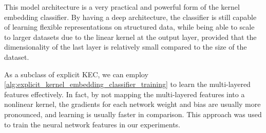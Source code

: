 \documentclass{article}
\begin{document}
		This model architecture is a very practical and powerful form of the kernel embedding classifier. By having a deep architecture, the classifier is still capable of learning flexible representations on structured data, while being able to scale to larger datasets due to the linear kernel at the output layer, provided that the dimensionality of the last layer is relatively small compared to the size of the dataset.
		
		As a subclass of explicit KEC, we can employ \cref{alg:explicit_kernel_embedding_classifier_training} to learn the multi-layered features effectively. In fact, by not mapping the multi-layered features into a nonlinear kernel, the gradients for each network weight and bias are usually more pronounced, and learning is usually faster in comparison. This approach was used to train the neural network features in our experiments.

%
%
\end{document}
